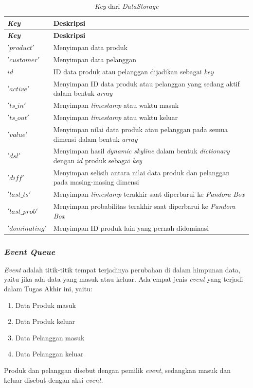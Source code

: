 \begin{longtable}{| p{2.5cm} | p{6.5cm} |}
	\caption{\textit{Key} dari \textit{DataStorage} \label{tab:desc-key}}\\
	\hline
	\textbf{\textit{Key}} & \textbf{Deskripsi} \\ \hline 
	\endfirsthead
	\hline
	\textbf{\textit{Key}} & \textbf{Deskripsi} \\ \hline 
	\endhead
	$'product'$ & Menyimpan data produk \\ \hline
	$'customer'$ & Menyimpan data pelanggan \\ \hline
	$id$ & ID data produk atau pelanggan dijadikan sebagai \textit{key} \\ \hline
	$'active'$ & Menyimpan ID data produk atau pelanggan yang sedang aktif dalam bentuk \textit{array} \\ \hline
	$'ts\_in'$ & Menyimpan \textit{timestamp} atau waktu masuk \\ \hline
	$'ts\_out'$ & Menyimpan \textit{timestamp} atau waktu keluar \\ \hline
	$'value'$ & Menyimpan nilai data produk atau pelanggan pada semua dimensi dalam bentuk \textit{array}\\ \hline
	$'dsl'$ & Menyimpan hasil \textit{dynamic skyline} dalam bentuk \textit{dictionary} dengan $id$ produk sebagai \textit{key}\\ \hline
	$'diff'$ & Menyimpan selisih antara nilai data produk dan pelanggan pada masing-masing dimensi \\ \hline
	$'last\_ts'$ & Menyimpan \textit{timestamp} terakhir saat diperbarui ke \textit{Pandora Box}\\ \hline
	$'last\_prob'$ & Menyimpan probabilitas terakhir saat diperbarui ke \textit{Pandora Box}\\ \hline
	$'dominating'$ & Menyimpan ID produk lain yang pernah didominasi\\ \hline
\end{longtable}

\subsubsection{\textit{Event Queue}}
\tab \textit{Event} adalah titik-titik tempat terjadinya perubahan di dalam himpunan data, yaitu jika ada data yang masuk atau keluar. Ada empat jenis \textit{event} yang terjadi dalam Tugas Akhir ini, yaitu:

\begin{enumerate}
	\item Data Produk masuk
	\item Data Produk keluar
	\item Data Pelanggan masuk
	\item Data Pelanggan keluar
\end{enumerate}
Produk dan pelanggan disebut dengan pemilik \textit{event}, sedangkan masuk dan keluar disebut dengan aksi \textit{event}.


